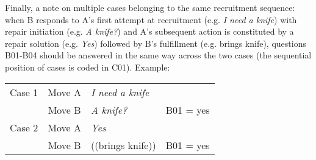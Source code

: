 \documentclass[output=paper]{langsci/langscibook}
\begin{document}
Finally, a note on multiple cases belonging to the same recruitment sequence: when B responds to A’s first attempt at recruitment (e.g. \textit{I need a knife}) with repair initiation (e.g. \textit{A knife?}) and A’s subsequent action is constituted by a repair solution (e.g. \textit{Yes}) followed by B’s fulfillment (e.g. brings knife), questions B01-B04 should be answered in the same way across the two cases (the sequential position of cases is coded in C01).
Example:\\

\begin{tabular}{l c l l}
{Case 1} &  Move A & \textit{I need a knife} & \\
                &  Move B & \textit{A knife?} &  B01 = yes\\
{Case 2} &  Move A & \textit{Yes} & \\
                &  Move B & ((brings knife)) & B01 = yes\\
\end{tabular}
\end{document}
